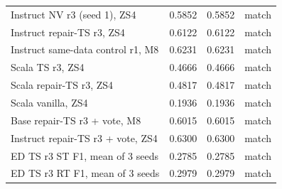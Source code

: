 {\begin{longtable}{@{}lrrl@{}}
Instruct NV r3 (seed 1), ZS4 & 0.5852 & 0.5852 & \textcolor{good}{match}\\
Instruct repair-TS r3, ZS4 & 0.6122 & 0.6122 & \textcolor{good}{match}\\
Instruct same-data control r1, M8 & 0.6231 & 0.6231 & \textcolor{good}{match}\\
Scala TS r3, ZS4 & 0.4666 & 0.4666 & \textcolor{good}{match}\\
Scala repair-TS r3, ZS4 & 0.4817 & 0.4817 & \textcolor{good}{match}\\
Scala vanilla, ZS4 & 0.1936 & 0.1936 & \textcolor{good}{match}\\
Base repair-TS r3 + vote, M8 & 0.6015 & 0.6015 & \textcolor{good}{match}\\
Instruct repair-TS r3 + vote, ZS4 & 0.6300 & 0.6300 & \textcolor{good}{match}\\
ED TS r3 ST F1, mean of 3 seeds & 0.2785 & 0.2785 & \textcolor{good}{match}\\
ED TS r3 RT F1, mean of 3 seeds & 0.2979 & 0.2979 & \textcolor{good}{match}\\
\end{longtable}
}
